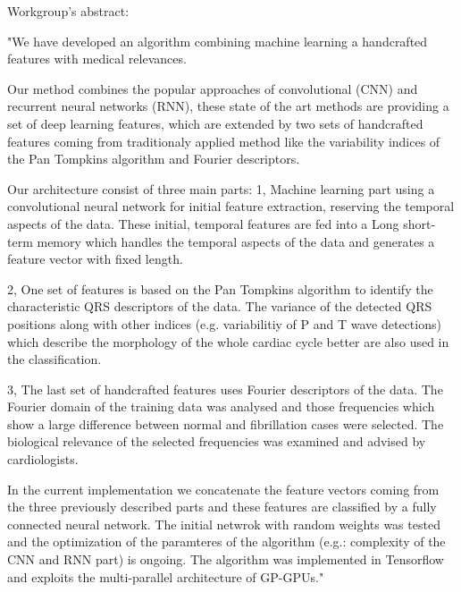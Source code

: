 Workgroup's abstract:

"We have developed an algorithm combining machine learning a handcrafted
features with medical relevances.

Our method combines the popular approaches of convolutional (CNN) and recurrent
neural networks (RNN), these state of the art methods are providing a set of
deep learning features, which are extended by two sets of handcrafted features
coming from traditionaly applied method like the variability indices of the Pan
Tompkins algorithm and Fourier descriptors.

Our architecture consist of three main parts: 1, Machine learning part using a
convolutional neural network for initial feature extraction, reserving the
temporal aspects of the data. These initial, temporal features are fed into a
Long short-term memory which handles the temporal aspects of the data and
generates a feature vector with fixed length.

2, One set of features is based on the Pan Tompkins algorithm to identify the
characteristic QRS descriptors of the data. The variance of the detected QRS
positions along with other indices (e.g. variabilitiy of P and T wave
detections) which describe the morphology of the whole cardiac cycle better are
also used in the classification.

3, The last set of handcrafted features uses Fourier descriptors of the data.
The Fourier domain of the training data was analysed and those frequencies which
show a large difference between normal and fibrillation cases were selected. The
biological relevance of the selected frequencies was examined and advised by
cardiologists.

In the current implementation we concatenate the feature vectors coming from the
three previously described parts and these features are classified by a fully
connected neural network. The initial netwrok with random weights was tested and
the optimization of the paramteres of the algorithm (e.g.: complexity of the CNN
and RNN part) is ongoing. The algorithm was implemented in Tensorflow and
exploits the multi-parallel architecture of GP-GPUs."
